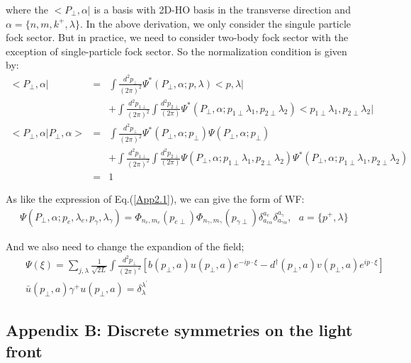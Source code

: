 \documentclass[a4paper,12pt]{article}
\begin{document}
where the $<P_{\perp},\alpha|$ is a basis with 2D-HO basis in the transverse direction and $\alpha = \{n,m,k^+,\lambda\}$. In the above derivation, we only consider the singule particle fock sector. But in practice, we need to consider two-body fock sector with the exception of single-particle fock sector. So the normalization condition is given by:
\begin{eqnarray}
  <P_{\perp},\alpha| &=& \int \frac{d^2 p_{\perp}}{(2\pi)^2} \Psi^{\ast}(P_{\perp},\alpha;p,\lambda) <p,\lambda|\nonumber\\&& + \int \frac{d^2 p_{1\perp}}{(2\pi)^2} \int \frac{d^2 p_{2\perp}}{(2\pi)} \Psi^{\ast}(P_{\perp},\alpha;p_{1\perp}\lambda_1,p_{2\perp}\lambda_2) <p_{1\perp}\lambda_1,p_{2\perp}\lambda_2|\nonumber\\
  <P_{\perp}, \alpha|P_{\perp},\alpha> &=& \int \frac{d^2 p_{\perp}}{(2\pi)^2} \Psi^{\ast}(P_{\perp},\alpha; p_{\perp})\Psi(P_{\perp},\alpha; p_{\perp}) \nonumber\\&&+ \int \frac{d^2 p_{1\perp}}{(2\pi)^2} \int \frac{d^2 p_{2\perp}}{(2\pi)} \Psi(P_{\perp},\alpha;p_{1\perp}\lambda_1,p_{2\perp}\lambda_2)\Psi^{\ast}(P_{\perp},\alpha;p_{1\perp}\lambda_1,p_{2\perp}\lambda_2)\nonumber\\&=& 1\nonumber\
\end{eqnarray}

As like the expression of Eq.(\ref{App2.1}), we can give the form of WF:
\begin{eqnarray}
  \Psi(P_{\perp},\alpha;p_e,\lambda_e,p_{\gamma},\lambda_{\gamma}) = \Phi_{n_e,m_e}(p_{e\perp}) \Phi_{n_{\gamma},m_{\gamma}}(p_{\gamma\perp})\delta^{a_e}_{a_{e\alpha}}\delta^{a_{\gamma}}_{a_{\gamma\alpha}},\ \ \ a=\{p^+,\lambda\}
\end{eqnarray}

And we also need to change the expandion of the field;
\begin{eqnarray}
  &&\Psi(\xi) = \sum_{j,\lambda} \frac{1}{\sqrt{2L}} \int \frac{d^2 p_{\perp}}{(2\pi)^2} [b(p_{\perp},a)u(p_{\perp},a)e^{-ip\cdot \xi}-d^{\dag}(p_{\perp},a)v(p_{\perp},a)e^{ip\cdot \xi}] \nonumber\\
  &&\bar{u}(p_{\perp},a) \gamma^+ u(p_{\perp},a) = \delta^{\lambda^{\prime}}_{\lambda} \nonumber\
\end{eqnarray}

\subsection{Appendix B: Discrete symmetries on the light front}
\end{document}
